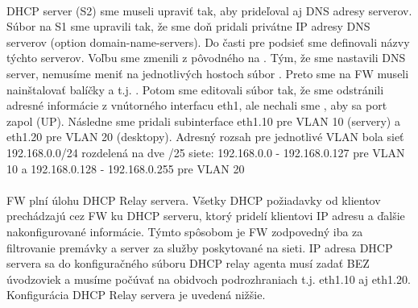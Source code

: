 \paragraph{}
DHCP server (S2) sme museli upraviť tak, aby prideľoval aj DNS adresy serverov. Súbor  na S1 sme upravili tak, že sme doň pridali privátne IP adresy DNS serverov (option domain-name-servers). Do časti pre podsieť sme definovali názvy týchto serverov. Voľbu  sme zmenili z pôvodného  na . Tým, že sme nastavili DNS server, nemusíme meniť na jednotlivých hostoch súbor .
Preto sme na FW museli nainštalovať balíčky  a  t.j. . Potom sme editovali súbor  tak, že sme odstránili adresné informácie z vnútorného interfacu eth1, ale nechali sme , aby sa port zapol (UP). Následne sme pridali subinterface eth1.10 pre VLAN 10 (servery) a eth1.20 pre VLAN 20 (desktopy). Adresný rozsah pre jednotlivé VLAN bola sieť 192.168.0.0/24 rozdelená na dve /25 siete: 192.168.0.0 - 192.168.0.127 pre VLAN 10 a 192.168.0.128 - 192.168.0.255 pre VLAN 20

\paragraph{}
FW plní úlohu DHCP Relay servera. Všetky DHCP požiadavky od klientov prechá\-dzajú cez FW ku DHCP serveru, ktorý pridelí klientovi IP adresu a ďalšie nakonfigurované informácie. Týmto spôsobom je FW zodpovedný iba za filtrovanie premávky a server za služby poskytované na sieti. IP adresa DHCP servera sa do konfiguračného súboru  DHCP relay agenta musí zadať BEZ úvodzoviek a musíme počúvať na obidvoch podrozhraniach t.j. eth1.10 aj eth1.20. Konfigurácia DHCP Relay servera je uvedená nižšie.

